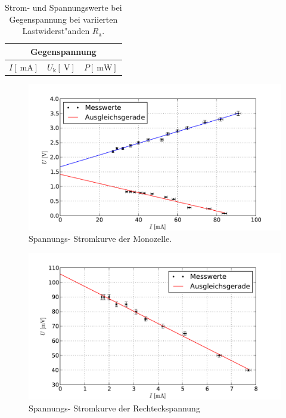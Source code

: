 		\begin{table}[h!]
			\begin{center}
				\caption{Strom- und Spannungswerte bei Gegenspannung bei variierten Lastwiderst"anden $R_\mathrm{a}$. \label{table:gegenspannung}}
				\begin{tabular}{|c|c|r|}
					\hline
						\multicolumn{3}{|c|}{Gegenspannung} \\
					\hline
						$I [\SI{}{\milli \ampere}]$ & $U_\mathrm{k} [\SI{}{\volt}]$ & $P [\SI{}{\milli \watt}]$ \\
					\hline 
					\hline
						
					\hline 
				\end{tabular}
			\end{center}
		\end{table}

		\begin{figure}[h]
			\centering
			\includegraphics[width = 15cm]{img/graph_monozelle.pdf}
			\caption{Spannungs- Stromkurve der Monozelle. \label{fig:graph_monozelle}}
		\end{figure}

		\begin{figure}[h]
			\centering
			\includegraphics[width = 15cm]{img/graph_rechteck.pdf}
			\caption{Spannungs- Stromkurve der Rechteckspannung \label{fig:graph_rechteck}}
		\end{figure}

